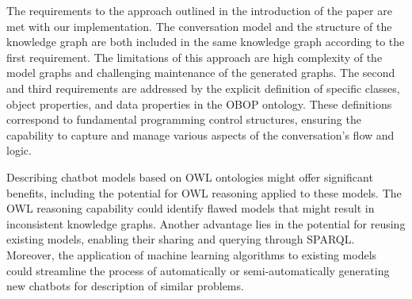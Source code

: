 \documentclass[runningheads]{llncs}
\begin{document}
The requirements to the approach outlined in the introduction of the paper are met with our implementation. The conversation model and the structure of the knowledge graph are both included in the same knowledge graph according to the first requirement. The limitations of this approach are high complexity of the model graphs and challenging maintenance of the generated graphs. The second and third requirements are addressed by the explicit definition of specific classes, object properties, and data properties in the OBOP ontology. These definitions correspond to fundamental programming control structures, ensuring the capability to capture and manage various aspects of the conversation's flow and logic. 

Describing chatbot models based on OWL ontologies might offer significant benefits, including the potential for OWL reasoning applied to these models. The OWL reasoning capability could identify flawed models that might result in inconsistent knowledge graphs. Another advantage lies in the potential for reusing existing models, enabling their sharing and querying through SPARQL. Moreover, the application of machine learning algorithms to existing models could streamline the process of automatically or semi-automatically generating new chatbots for description of similar problems.

%
%
%


%
\end{document}

